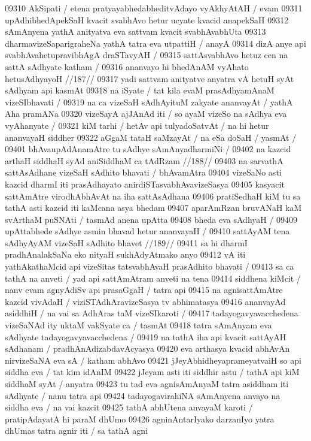 09310 AkSipati / etena pratyayabhedabheditvAdayo vyAkhyAtAH / evam  
09311 upAdhibhedApekSaH kvacit svabhAvo hetur ucyate kvacid anapekSaH
09312 sAmAnyena yathA anityatva eva sattvam kvacit svabhAvabhUta
09313 dharmavizeSaparigraheNa yathA tatra eva utpattiH / anayA  
09314 dizA anye api svabhAvahetupravibhAgA draSTavyAH /
09315 	sattAsvabhAvo hetuz cen na sattA sAdhyate katham /  
09316 	ananvayo hi bhedAnAM vyAhato hetusAdhyayoH //187//  
09317 yadi sattvam anityatve anyatra vA hetuH syAt sAdhyam api kasmAt 
09318 na iSyate / tat kila evaM prasAdhyamAnaM vizeSIbhavati /
09319 na ca vizeSaH sAdhAyituM zakyate ananvayAt / yathA Aha pramANa  
09320 vizeSayA ajJAnAd iti / so ayaM vizeSo na sAdhya eva vyAhanyate /  
09321 kiM tarhi / hetAv api tulyadoSatvAt / na hi hetur ananvayaH siddher 
09322 aGgaM tataH saMzayAt / na eSa doSaH / yasmAt /  
09401 	bhAvaupAdAnamAtre tu sAdhye sAmAnyadharmiNi /  
09402 	na kazcid arthaH siddhaH syAd aniSiddhaM ca tAdRzam //188//  
09403 na sarvathA sattAsAdhane vizeSaH sAdhito bhavati / bhAvamAtra 
09404 vizeSaNo asti kazcid dharmI iti prasAdhayato anirdiSTasvabhAvavizeSasya
09405 kasyacit sattAmAtre virodhAbhAvAt na iha sattAsAdhana 
09406 pratiSedhaH kiM tu sa tathA asti kazcid iti kaMcana asya bhedam 
09407 aparAmRzan bruvANaH kaM svArthaM puSNAti / tasmAd anena upAtta 
09408 bheda eva sAdhyaH /
09409 	upAttabhede sAdhye asmin bhavad hetur ananvayaH /  
09410 	sattAyAM tena sAdhyAyAM vizeSaH sAdhito bhavet //189//
09411 sa hi dharmI pradhAnalakSaNa eko nityaH sukhAdyAtmako anyo  
09412 vA iti yathAkathaMcid api vizeSitas tatsvabhAvaH prasAdhito bhavati /
09413 sa ca tathA na anveti / yad api sattAmAtram anveti na tena
09414 siddhena kiMcit / nanv evam agnyAdiSv api prasaGgaH / tatra api
09415 na agnisattAmAtre kazcid vivAdaH / viziSTAdhAravizeSasya tv abhimatasya
09416 ananvayAd asiddhiH / na vai sa AdhAras taM vizeSIkaroti / 
09417 tadayogavyavacchedena vizeSaNAd ity uktaM vakSyate ca / tasmAt
09418 tatra sAmAnyam eva sAdhyate tadayogavyavacchedena / 
09419 na tathA iha api kvacit sattAyAH sAdhanam / pradhAnAdizabdavAcyasya
09420 eva arthasya kvacid abhAvAn nirvizeSaNA eva sA / katham abhAvo 
09421 jJeyAbhidheyaprameyatvaiH so api siddha eva / tat kim idAnIM
09422 jJeyam asti iti siddhir astu / tathA api kiM siddhaM syAt / anyatra  
09423 tu tad eva agnisAmAnyaM tatra asiddham iti sAdhyate / nanu tatra api  
09424 tadayogavirahiNA sAmAnyena anvayo na siddha eva / na vai kazcit
09425 tathA abhUtena anvayaM karoti / pratipAdayatA hi paraM dhUmo
09426 agninAntarIyako darzanIyo yatra dhUmas tatra agnir iti / sa tathA agni
